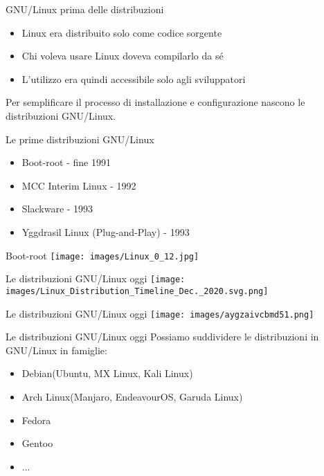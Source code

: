 \begin{frame}{GNU/Linux prima delle distribuzioni}
    \begin{itemize}
        \item Linux era distribuito solo come codice sorgente
        \item Chi voleva usare Linux doveva compilarlo da sé
        \item L'utilizzo era quindi accessibile solo agli sviluppatori
    \end{itemize}
    \hfill \break
    Per semplificare il processo di installazione e configurazione nascono le distribuzioni GNU/Linux.
\end{frame}


\begin{frame}{Le prime distribuzioni GNU/Linux}
    \begin{itemize}
        \item Boot-root - fine 1991
        \item MCC Interim Linux - 1992
        \item Slackware - 1993
        \item Yggdrasil Linux (Plug-and-Play) - 1993
    \end{itemize}
\end{frame}

\begin{frame}{Boot-root}
    \centering
    \texttt{[image: images/Linux\_0\_12.jpg]}
\end{frame}


\begin{frame}{Le distribuzioni GNU/Linux oggi}
    \centering
    \texttt{[image: images/Linux\_Distribution\_Timeline\_Dec.\_2020.svg.png]}
\end{frame}

\begin{frame}{Le distribuzioni GNU/Linux oggi}
    \centering
    \texttt{[image: images/aygzaivcbmd51.png]}
\end{frame}

\begin{frame}{Le distribuzioni GNU/Linux oggi}
Possiamo suddividere le distribuzioni in GNU/Linux in famiglie:
\begin{itemize}
    \item Debian(Ubuntu, MX Linux, Kali Linux)
    \item Arch Linux(Manjaro, EndeavourOS, Garuda Linux)
    \item Fedora
    \item Gentoo
    \item ...
\end{itemize}

\end{frame}

